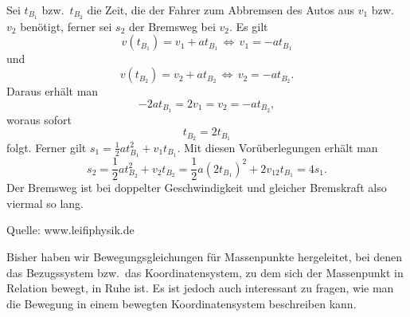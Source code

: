 \begin{MExercises}
\begin{MExercise}
     
     \begin{MSolution}
     Sei $t_{B_1}$ bzw.~$t_{B_2}$ die Zeit, die der Fahrer zum Abbremsen des Autos aus $v_1$ bzw.~$v_2$ ben\"otigt, ferner sei $s_2$ der Bremsweg bei $v_2$. Es gilt 
     \begin{equation*}
     v(t_{B_1})=v_1+at_{B_1}\,\Leftrightarrow\, v_1=-at_{B_1}
     \end{equation*} und
     \begin{equation*}
     v(t_{B_2})=v_2+at_{B_2}\,\Leftrightarrow\, v_2=-at_{B_2}.
     \end{equation*}
     Daraus erh\"alt man
     \begin{equation*}
     -2at_{B_1}=2v_1=v_2=-at_{B_2},
     \end{equation*}woraus sofort 
     \begin{equation*}
     t_{B_2}=2t_{B_1}
     \end{equation*}folgt. Ferner gilt $s_1=\frac{1}{2}at_{B_1}^2+v_1t_{B_1}$. Mit diesen Vor\"uberlegungen erh\"alt man
     \begin{equation*}
     s_2=\frac{1}{2}at_{B_2}^2+v_2t_{B_2}=\frac{1}{2}a(2t_{B_1})^2+2v_12t_{B_1}=4s_1.
     \end{equation*}Der Bremsweg ist bei doppelter Geschwindigkeit und gleicher Bremskraft also viermal so lang.\\
     \end{MSolution}
     
     Quelle: www.leifiphysik.de
     \end{MExercise}
     
     
     \end{MExercises}

          
          

     \begin{MIntro}
     Bisher haben wir Bewegungsgleichungen f\"ur Massenpunkte hergeleitet, bei denen das Bezugssystem bzw.~das Koordinatensystem, zu dem sich der Massenpunkt in Relation bewegt, in Ruhe ist. Es ist jedoch auch interessant zu fragen, wie man die Bewegung in einem bewegten Koordinatensystem beschreiben kann. 
     \end{MIntro}
   
